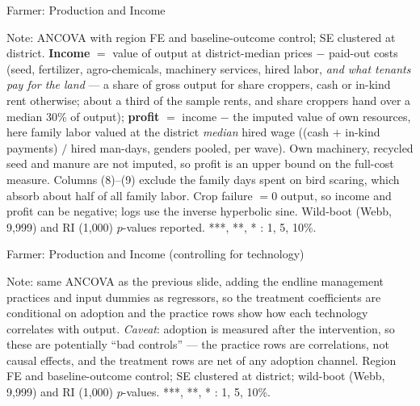 \documentclass[aspectratio=169]{beamer}
\newcommand{\notefont}{\fontsize{5pt}{6pt}\selectfont}
\begin{document}
\begin{frame}{Farmer: Production and Income}
	\centering
	\begin{minipage}{0.94\textwidth}
		\notefont
		Note: ANCOVA with region FE and baseline-outcome control; SE clustered at district.
		\textbf{Income} $=$ value of output at district-median prices $-$ paid-out costs (seed,
		fertilizer, agro-chemicals, machinery services, hired labor, \emph{and what tenants pay for
		the land} --- a share of gross output for share croppers, cash or in-kind rent otherwise;
		about a third of the sample rents, and share croppers hand over a median 30\% of output);
		\textbf{profit} $=$ income
		$-$ the imputed value of own resources, here family labor valued at the district
		\emph{median} hired wage ((cash $+$ in-kind payments) $/$ hired man-days, genders pooled,
		per wave). Own machinery, recycled seed and manure are not imputed, so profit is an upper
		bound on the full-cost measure. Columns (8)--(9) exclude the family days spent on bird
		scaring, which absorb about half of all family labor. Crop failure $=0$ output, so income
		and profit can be negative; logs use the inverse hyperbolic sine. Wild-boot (Webb,
		9{,}999) and RI (1{,}000) $p$-values reported. ***, **, * : 1, 5, 10\%.
	\end{minipage}
\end{frame}

\begin{frame}{Farmer: Production and Income (controlling for technology)}
	\centering
	\begin{minipage}{0.94\textwidth}
		\notefont
		Note: same ANCOVA as the previous slide, adding the endline management
		practices and input dummies as regressors, so the treatment coefficients are
		conditional on adoption and the practice rows show how each technology correlates
		with output. \emph{Caveat}: adoption is measured after the intervention, so these
		are potentially ``bad controls'' --- the practice rows are correlations, not causal
		effects, and the treatment rows are net of any adoption channel. Region FE and
		baseline-outcome control; SE clustered at district; wild-boot (Webb, 9{,}999) and
		RI (1{,}000) $p$-values. ***, **, * : 1, 5, 10\%.
	\end{minipage}
\end{frame}
\end{document}
